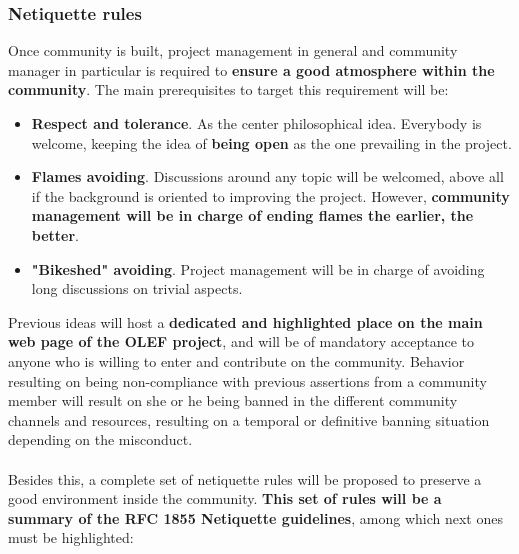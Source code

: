\documentclass[11pt]{article}
\begin{document}
\subsubsection{Netiquette rules}
Once community is built, project management in general and community manager in particular is required to \textbf{ensure a good atmosphere within the community}. The main prerequisites to target this requirement will be:
\begin{itemize}\itemsep0pt
\item{\textbf{Respect and tolerance}}. As the center philosophical idea. Everybody is welcome, keeping the idea of \textbf{being open} as the one prevailing in the project.
\item{\textbf{Flames avoiding}}. Discussions around any topic will be welcomed, above all if the background is oriented to improving the project. However, \textbf{community management will be in charge of ending flames the earlier, the better}.
\item{\textbf{"Bikeshed" avoiding}}. Project management will be in charge of avoiding long discussions on trivial aspects. 
\end{itemize}
Previous ideas will host a \textbf{dedicated and highlighted place on the main web page of the OLEF project}, and will be of mandatory acceptance to anyone who is willing to enter and contribute on the community. Behavior resulting on being non-compliance with previous assertions from a community member will result on she or he being banned in the different community channels and resources, resulting on a temporal or definitive banning situation depending on the misconduct.\\
\\
Besides this, a complete set of netiquette rules will be proposed to preserve a good environment inside the community. \textbf{This set of rules will be a summary of the RFC 1855 Netiquette guidelines}, among which next ones must be highlighted:
\end{document}

